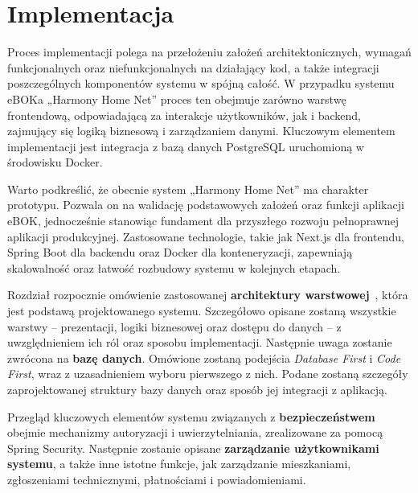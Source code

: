 \chapter{Implementacja}
Proces implementacji polega na przełożeniu założeń architektonicznych, wymagań funkcjonalnych oraz niefunkcjonalnych na działający kod, a także integracji poszczególnych komponentów systemu w spójną całość. W przypadku systemu eBOKa „Harmony Home Net” proces ten obejmuje zarówno warstwę frontendową, odpowiadającą za interakcje użytkowników, jak i backend, zajmujący się logiką biznesową i zarządzaniem danymi. Kluczowym elementem implementacji jest integracja z bazą danych PostgreSQL uruchomioną w środowisku Docker.

Warto podkreślić, że obecnie system „Harmony Home Net” ma charakter prototypu. Pozwala on na walidację podstawowych założeń oraz funkcji aplikacji eBOK, jednocześnie stanowiąc fundament dla przyszłego rozwoju pełnoprawnej aplikacji produkcyjnej. Zastosowane technologie, takie jak Next.js dla frontendu, Spring Boot dla backendu oraz Docker dla konteneryzacji, zapewniają skalowalność oraz łatwość rozbudowy systemu w kolejnych etapach.

Rozdział rozpocznie omówienie zastosowanej \textbf{architektury warstwowej}~\cite{n_tier_wiki}, która jest podstawą projektowanego systemu. Szczegółowo opisane zostaną wszystkie warstwy – prezentacji, logiki biznesowej oraz dostępu do danych – z uwzględnieniem ich ról oraz sposobu implementacji. Następnie uwaga zostanie zwrócona na \textbf{bazę danych}. Omówione zostaną podejścia \emph{Database First} i \emph{Code First}, wraz z uzasadnieniem wyboru pierwszego z nich. Podane zostaną szczegóły zaprojektowanej struktury bazy danych oraz sposób jej integracji z aplikacją.

Przegląd kluczowych elementów systemu związanych z \textbf{bezpieczeństwem} obejmie mechanizmy autoryzacji i uwierzytelniania, zrealizowane za pomocą Spring Security. Następnie zostanie opisane \textbf{zarządzanie użytkownikami systemu}, a także inne istotne funkcje, jak zarządzanie mieszkaniami, zgłoszeniami technicznymi, płatnościami i powiadomieniami.




